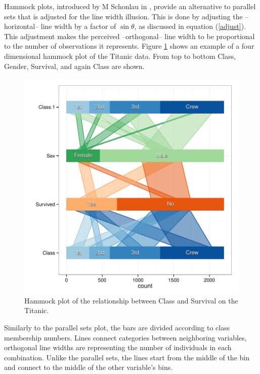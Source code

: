 Hammock plots, introduced by M Schonlau in \cite{schonlau:2003}, provide an alternative to parallel sets that is adjusted for the line width illusion. This is done by  adjusting the --horizontal-- line width by  a factor of $\sin \theta$, as discussed in equation (\ref{adjust}). This adjustment makes the perceived --orthogonal-- line width to be proportional to the number of observations it represents. 
 Figure \ref{hammock} shows an example of a four dimensional hammock plot of the Titanic data. From top to bottom Class, Gender, Survival, and again Class are shown. 
\begin{figure}
\centering
\includegraphics[width=\linewidth]{images/hammock-titanic}
\caption{\label{hammock} Hammock plot of the relationship between Class and Survival on the Titanic. }
\end{figure}

Similarly to the parallel sets plot, the bars are divided according to class membership numbers.  Lines connect categories between neighboring variables, orthogonal line widths are representing the number of individuals in each combination. Unlike the parallel sets, the lines start from the middle of the bin and connect to the middle of the other variable's bins. 

